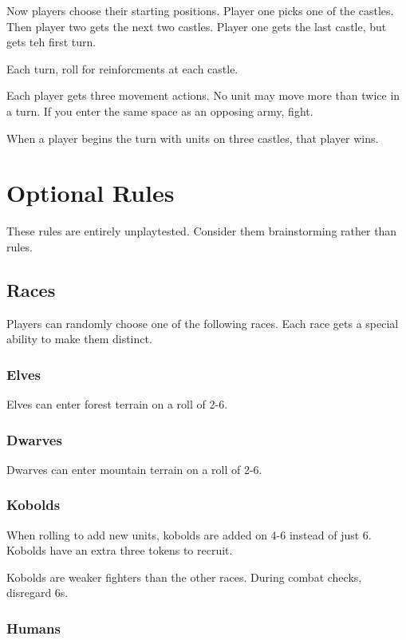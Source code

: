 \documentclass{article}
\begin{document}
Now players choose their starting positions.  Player one picks one of the castles.  Then player two gets the next two castles.  Player one gets the last castle, but gets teh first turn.

Each turn, roll for reinforcments at each castle.

Each player gets three movement actions.  No unit may move more than twice in a turn.  If you enter the same space as an opposing army, fight.

When a player begins the turn with units on three castles, that player wins.  

\newpage
\section{Optional Rules}

These rules are entirely unplaytested.  Consider them brainstorming rather than rules.

\subsection{Races}

Players can randomly choose one of the following races.  Each race gets a special ability to make them distinct.

\subsubsection{Elves}

Elves can enter forest terrain on a roll of 2-6.

\subsubsection{Dwarves}

Dwarves can enter mountain terrain on a roll of 2-6.

\subsubsection{Kobolds}

When rolling to add new units, kobolds are added on 4-6 instead of just 6.  Kobolds have an extra three tokens to recruit.

Kobolds are weaker fighters than the other races.  During combat checks, disregard 6s.

\subsubsection{Humans}
\end{document}
